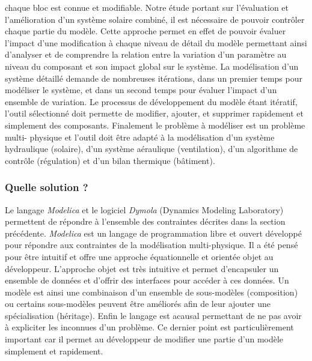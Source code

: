 chaque bloc est connue et modifiable. Notre étude portant sur l’évaluation et
l’amélioration d’un système solaire combiné, il est nécessaire de pouvoir contrôler chaque
partie du modèle. Cette approche permet en effet de pouvoir évaluer l’impact d’une
modification à chaque niveau de détail du modèle permettant ainsi d’analyser et de
comprendre la relation entre la variation d’un paramètre au niveau du composant et son
impact global sur le système. La modélisation d’un système détaillé demande de nombreuses
itérations, dans un premier temps pour modéliser le système, et dans un second temps pour
évaluer l’impact d’un ensemble de variation. Le processus de développement du modèle étant
itératif, l’outil sélectionné doit permette de modifier, ajouter, et supprimer rapidement
et simplement des composants. Finalement le problème à modéliser est un problème multi-
physique et l’outil doit être adapté à la modélisation d’un système hydraulique (solaire),
d’un système aéraulique (ventilation), d’un algorithme de contrôle (régulation) et d’un
bilan thermique (bâtiment).


\subsubsection{Quelle solution ?} %
\label{ssub:quelle_solution}
Le langage \textit{Modelica} et le logiciel \textit{Dymola} (Dynamics Modeling Laboratory) permettent de
répondre à l’ensemble des contraintes décrites dans la section précédente. \textit{Modelica} est un
langage de programmation libre et ouvert développé pour répondre aux contraintes de la
modélisation multi-physique. Il a été pensé pour être intuitif et offre une approche
équationnelle et orientée objet au développeur. L’approche objet est très intuitive et
permet d’encapsuler un ensemble de données et d’offrir des interfaces pour accéder à ces
données. Un modèle est ainsi une combinaison d’un ensemble de sous-modèles (composition)
ou certains sous-modèles peuvent être améliorés afin de leur ajouter une spécialisation
(héritage). Enfin le langage est acausal permettant de ne pas avoir à expliciter les
inconnues d’un problème. Ce dernier point est particulièrement important car il permet au
développeur de modifier une partie d’un modèle simplement et rapidement.

